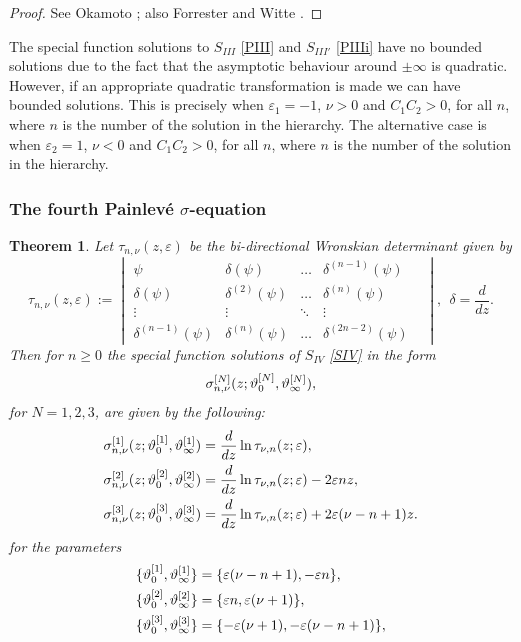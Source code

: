 \documentclass[12pt]{article}
\def\P{Painlev\'e }
\newtheorem{mydef}{Theorem}[section]
\numberwithin{figure}{section}
\numberwithin{equation}{section}
\numberwithin{table}{section}
\begin{document}
\begin{proof}
See Okamoto \cite{P:275:221}; also Forrester and Witte \cite{P:219:357}.
\end{proof}
The special function solutions to $S_{III}$ \eqref{PIII} and $S_{III'}$ \eqref{PIIIi} have no bounded solutions due to the fact that the asymptotic behaviour around $\pm\infty$ is quadratic. However, if an appropriate quadratic transformation is made we can have bounded solutions. This is precisely when $\varepsilon_1=-1$, $\nu>0$ and $C_1C_2>0$, for all $n$, where $n$ is the number of the solution in the hierarchy. The alternative case is when $\varepsilon_2=1$, $\nu<0$ and $C_1C_2>0$, for all $n$, where $n$ is the number of the solution in the hierarchy.
\subsubsection{The fourth \P $\sigma$-equation}
\begin{mydef}
Let $\tau_{n,\nu}(z,\varepsilon)$ be the bi-directional Wronskian determinant given by
\[
\tau_{n,\nu}(z,\varepsilon):=
\!\begin{vmatrix}
\psi & \delta(\psi) &\hdots& \delta^{(n-1)}(\psi) \\
\delta(\psi) & \delta^{(2)}(\psi) &\hdots& \delta^{(n)}(\psi)  \\
\vdots &\vdots & \ddots & \vdots & \\
\delta^{(n-1)}(\psi) & \delta^{(n)}(\psi) &\hdots& \delta^{(2n-2)}(\psi)
\end{vmatrix},~~\delta=\frac{d}{dz}.
\]
Then for $n\geq0$ the special function solutions of $S_{IV}$ \eqref{SIV} in the form $$\sigma^{[N]}_{n,\nu}(z;\vartheta_0^{[N]},\vartheta_\infty^{[N]}),$$ for $N=1,2,3$, are given by the following:
\begin{subequations}
\begin{align}
&\sigma^{[1]}_{n,\nu}(z;\vartheta_0^{[1]},\vartheta_\infty^{[1]})=\frac{d}{dz}\ln\tau_{\nu,n}(z;\varepsilon),\\
&\sigma^{[2]}_{n,\nu}(z;\vartheta_0^{[2]},\vartheta_\infty^{[2]})=\frac{d}{dz}\ln\tau_{\nu,n}(z;\varepsilon)-2\varepsilon nz,\\
&\sigma^{[3]}_{n,\nu}(z;\vartheta_0^{[3]},\vartheta_\infty^{[3]})=\frac{d}{dz}\ln\tau_{\nu,n}(z;\varepsilon)+2\varepsilon(\nu-n+1)z.
\end{align}
\end{subequations}
for the parameters
\begin{subequations}
\begin{align*}
\{\vartheta_0^{[1]},\vartheta_\infty^{[1]}\}&=\{\varepsilon(\nu-n+1),-\varepsilon n\},\\
\{\vartheta_0^{[2]},\vartheta_\infty^{[2]}\}&=\{\varepsilon n,\varepsilon (\nu+1)\},\\
\{\vartheta_0^{[3]},\vartheta_\infty^{[3]}\}&=\{-\varepsilon(\nu+1),-\varepsilon (\nu-n+1)\},
\end{align*}
\end{subequations}
\end{mydef}
\end{document}
